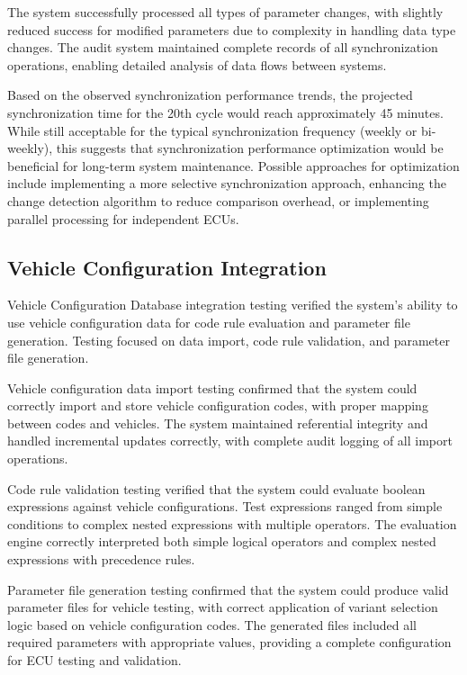 The system successfully processed all types of parameter changes, with slightly reduced success for modified parameters due to complexity in handling data type changes. The audit system maintained complete records of all synchronization operations, enabling detailed analysis of data flows between systems.

Based on the observed synchronization performance trends, the projected synchronization time for the 20th cycle would reach approximately 45 minutes. While still acceptable for the typical synchronization frequency (weekly or bi-weekly), this suggests that synchronization performance optimization would be beneficial for long-term system maintenance. Possible approaches for optimization include implementing a more selective synchronization approach, enhancing the change detection algorithm to reduce comparison overhead, or implementing parallel processing for independent \acp{ECU}.

\subsection{Vehicle Configuration Integration}
\label{subsec:vehicle-configuration-testing}

Vehicle Configuration Database integration testing verified the system's ability to use vehicle configuration data for code rule evaluation and parameter file generation. Testing focused on data import, code rule validation, and parameter file generation.

Vehicle configuration data import testing confirmed that the system could correctly import and store vehicle configuration codes, with proper mapping between codes and vehicles. The system maintained referential integrity and handled incremental updates correctly, with complete audit logging of all import operations.

Code rule validation testing verified that the system could evaluate boolean expressions against vehicle configurations. Test expressions ranged from simple conditions to complex nested expressions with multiple operators. The evaluation engine correctly interpreted both simple logical operators and complex nested expressions with precedence rules.

Parameter file generation testing confirmed that the system could produce valid parameter files for vehicle testing, with correct application of variant selection logic based on vehicle configuration codes. The generated files included all required parameters with appropriate values, providing a complete configuration for \ac{ECU} testing and validation.

